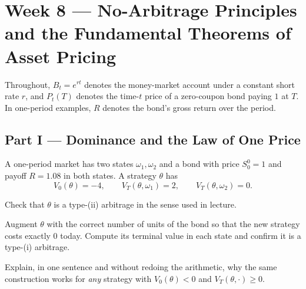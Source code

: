 \section{Week 8 --- No-Arbitrage Principles and the Fundamental Theorems of Asset Pricing}

Throughout, \(B_t=e^{rt}\) denotes the money-market account under a constant
short rate \(r\), and \(P_t(T)\) denotes the time-\(t\) price of a
zero-coupon bond paying \(1\) at \(T\). In one-period examples, \(R\) denotes
the bond's gross return over the period.

\subsection*{Part I --- Dominance and the Law of One Price}

\begin{exercise}
A one-period market has two states \(\omega_1,\omega_2\) and a bond with
price \(S_0^0=1\) and payoff \(R=1.08\) in both states. A strategy
\(\theta\) has
\[
V_0(\theta)=-4,
\qquad
V_T(\theta,\omega_1)=2,
\qquad
V_T(\theta,\omega_2)=0.
\]
\begin{exparts}
  \item Check that \(\theta\) is a type-(ii) arbitrage in the sense used in
  lecture.
  \item Augment \(\theta\) with the correct number of units of the bond so
  that the new strategy costs exactly \(0\) today. Compute its terminal
  value in each state and confirm it is a type-(i) arbitrage.
  \item Explain, in one sentence and without redoing the arithmetic, why the
  same construction works for \emph{any} strategy with \(V_0(\theta)<0\) and
  \(V_T(\theta,\cdot)\geq0\).
\end{exparts}
\end{exercise}


